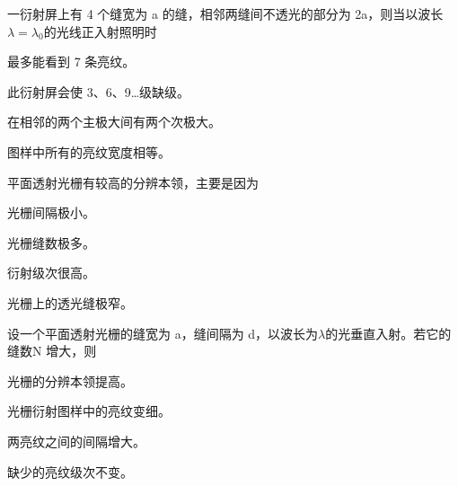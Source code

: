 \documentclass[padl, analysis, notocnum]{ExBook}
\newcommand{\answerarea}[1][3.5cm]{%
  \par\vspace{1mm}%
  \noindent{\color{themeColor!35}\rule{\linewidth}{0.4pt}}\par
  \noindent\begin{minipage}[t][#1][t]{\linewidth}\vspace{0pt}\end{minipage}\par
  \noindent{\color{themeColor!35}\rule{\linewidth}{0.4pt}}\par
}
\begin{document}
\begin{qitems}[startnum=9]
\qitem 一衍射屏上有 4 个缝宽为 a 的缝，相邻两缝间不透光的部分为 2a，则当以波长$\lambda =\lambda_{0}$的光线正入射照明时
\par\noindent\hspace{2em}最多能看到 7 条亮纹。
\par\noindent\hspace{2em}此衍射屏会使 3、6、9…级缺级。
\par\noindent\hspace{2em}在相邻的两个主极大间有两个次极大。
\par\noindent\hspace{2em}图样中所有的亮纹宽度相等。
\label{q:267:start}
\answerarea[4.0cm]
\label{q:267:end}
\end{qitems}

\begin{qitems}[startnum=10]
\qitem 平面透射光栅有较高的分辨本领，主要是因为
\par\noindent\hspace{2em}光栅间隔极小。
\par\noindent\hspace{2em}光栅缝数极多。
\par\noindent\hspace{2em}衍射级次很高。
\par\noindent\hspace{2em}光栅上的透光缝极窄。
\label{q:268:start}
\answerarea[4.0cm]
\label{q:268:end}
\end{qitems}

\begin{qitems}[startnum=11]
\qitem 设一个平面透射光栅的缝宽为 a，缝间隔为 d，以波长为$\lambda$的光垂直入射。若它的缝数N 增大，则
\par\noindent\hspace{2em}光栅的分辨本领提高。
\par\noindent\hspace{2em}光栅衍射图样中的亮纹变细。
\par\noindent\hspace{2em}两亮纹之间的间隔增大。
\par\noindent\hspace{2em}缺少的亮纹级次不变。
\label{q:269:start}
\answerarea[4.0cm]
\label{q:269:end}
\end{qitems}
\end{document}
